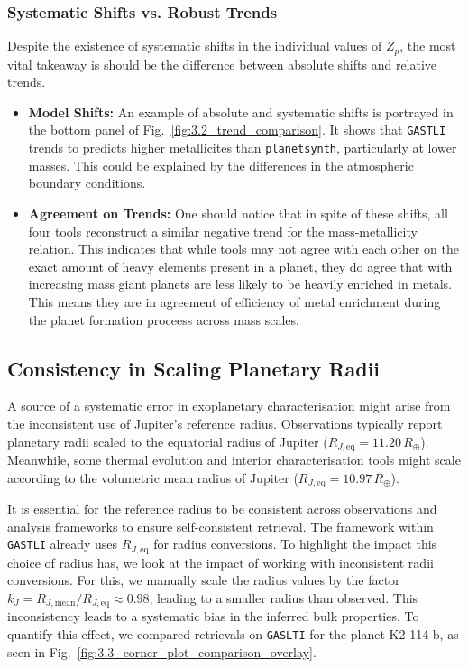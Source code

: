 \documentclass{aa}
\begin{document}
\subsubsection{Systematic Shifts vs. Robust Trends}
Despite the existence of systematic shifts in the individual values of $Z_p$, the most vital takeaway is should be the difference between absolute shifts and relative trends.
\begin{itemize}
    \item{\textbf{Model Shifts:} An example of absolute and systematic shifts is portrayed in the bottom panel of Fig.~\ref{fig:3.2_trend_comparison}. It shows that \texttt{GASTLI} trends to predicts higher metallicites than \texttt{planetsynth}, particularly at lower masses. This could be explained by the differences in the atmospheric boundary conditions.}
    \item{\textbf{Agreement on Trends:} One should notice that in spite of these shifts, all four tools reconstruct a similar negative trend for the mass-metallicity relation. This indicates that while tools may not agree with each other on the exact amount of heavy elements present in a planet, they do agree that with increasing mass giant planets are less likely to be heavily enriched in metals. This means they are in agreement of efficiency of metal enrichment during the planet formation proceess across mass scales.}
\end{itemize}

\subsection{Consistency in Scaling Planetary Radii}
A source of a systematic error in exoplanetary characterisation might arise from the inconsistent use of Jupiter's reference radius. Observations typically report planetary radii scaled to the equatorial radius of Jupiter ($R_{J, \text{eq}} = 11.20\, R_{\oplus}$). Meanwhile, some thermal evolution and interior characterisation tools might scale according to the volumetric mean radius of Jupiter ($R_{J, \text{eq}} = 10.97\, R_{\oplus}$). 

It is essential for the reference radius to be consistent across observations and analysis frameworks to ensure self-consistent retrieval. The framework within \texttt{GASTLI} already uses $R_{J,\text{eq}}$ for radius conversions. To highlight the impact this choice of radius has, we look at the impact of working with inconsistent radii conversions. For this, we manually scale the radius values by the factor $k_J = R_{J,\text{mean}} / R_{J,\text{eq}} \approx 0.98$, leading to a smaller radius than observed. This inconsistency leads to a systematic bias in the inferred bulk properties. To quantify this effect, we compared retrievals on \texttt{GASLTI} for the planet K2-114 b, as seen in Fig.~\ref{fig:3.3_corner_plot_comparison_overlay}.
\end{document}
